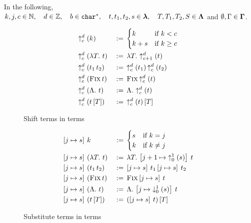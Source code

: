 In the following, $k,j,c\in \mathbb{N},\quad d \in \mathbb{Z},\quad b \in \texttt{char}^{*},\quad t,t_1,t_2,s \in \bm\lambda,\quad T,T_1,T_2,S \in \bm\Lambda$ and $\emptyset,\Gamma \in \bm\Gamma$.

\begin{subfigure}[t]{0.45\linewidth}
    \begin{alignat*}{2}
        &{\uparrow^{d}_{c}\left(k\right)} &&\mathrel{:=\,} \begin{cases} k & \textup{if } k < c \\ k+s & \textup{if } k \geq c \end{cases} \\
        &{\uparrow^{d}_{c}\left(\lambda{}{T}.\ {t}\right)} &&\mathrel{:=\,} \lambda{}{T}.\ {{\uparrow^{d}_{c+1}\left(t\right)}} \\
        &{\uparrow^{d}_{c}\left({t_1}\,{t_2}\right)} &&\mathrel{:=\,} {{\uparrow^{d}_{c}\left(t_1\right)}}\,{{\uparrow^{d}_{c}\left(t_2\right)}} \\
        &{\uparrow^{d}_{c}\left({\textsc{Fix}}\,{t}\right)} &&\mathrel{:=\,} {\textsc{Fix}}\,{{\uparrow^{d}_{c}\left(t\right)}} \\
        &{\uparrow^{d}_{c}\left(\Lambda{}.\ {t}\right)} &&\mathrel{:=\,} \Lambda{}.\ {{\uparrow^{d}_{c}\left(t\right)}} \\
        &{\uparrow^{d}_{c}\left({t}\left[{T}\right]\right)} &&\mathrel{:=\,} {{\uparrow^{d}_{c}\left(t\right)}}\left[{T}\right]
    \end{alignat*}
    \caption{Shift terms in terms}
\end{subfigure}
\hfill
\begin{subfigure}[t]{0.45\linewidth}
    \begin{alignat*}{2}
        & \left[{j} \mapsto{} {s}\right]\:{k} && \mathrel{:=\,} \begin{cases} s & \textup{if } k = j \\ k & \textup{if } k \not= j \end{cases} \\
        & \left[{j} \mapsto{} {s}\right]\:{(\lambda{}{T}.\ {t})} && \mathrel{:=\,} \lambda{}{T}.\ {\left[{j+1} \mapsto{} {{\uparrow^{1}_{0}\left(s\right)}}\right]\:{t}} \\
        & \left[{j} \mapsto{} {s}\right]\:{({t_1}\,{t_2})} && \mathrel{:=\,} {\left[{j} \mapsto{} {s}\right]\:{t_1}}\,{\left[{j} \mapsto{} {s}\right]\:{t_2}} \\
        & \left[{j} \mapsto{} {s}\right]\:{({\textsc{Fix}}\,{t})} && \mathrel{:=\,} {\textsc{Fix}}\,{\left[{j} \mapsto{} {s}\right]\:{t}} \\
        & \left[{j} \mapsto{} {s}\right]\:{(\Lambda{}.\ {t})} && \mathrel{:=\,} \Lambda{}.\ {\left[{j} \mapsto{} {{\downarrow^{1}_{0}\left({s}\right)}}\right]\:{t}} \\
        & \left[{j} \mapsto{} {s}\right]\:{({t}\left[{T}\right])} && \mathrel{:=\,} {(\left[{j} \mapsto{} {s}\right]\:{t})}\left[{T}\right]
    \end{alignat*}
    \caption{Substitute terms in terms}
\end{subfigure}

